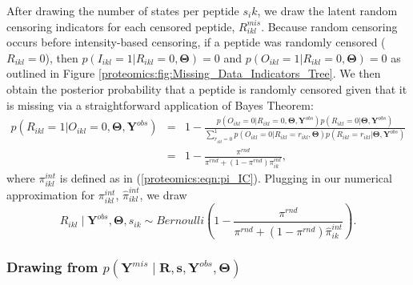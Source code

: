 After drawing the number of states per peptide $s_ik$, we draw the latent random censoring indicators for each censored peptide, $R_{ikl}^{mis}$.
Because random censoring occurs before intensity-based censoring, if a peptide was randomly censored ($R_{ikl}=0$), then $p(I_{ikl}=1\vert R_{ikl}=0,\bm{\Theta})=0$ and $p(O_{ikl}=1\vert R_{ikl}=0,\bm{\Theta})=0$ as outlined in Figure \ref{proteomics:fig:Missing_Data_Indicators_Tree}.
We then obtain the posterior probability that a peptide is randomly censored given that it is missing via a straightforward application of Bayes Theorem:
\begin{eqnarray}
p(R_{ikl}=1\vert O_{ikl}=0,\bm{\Theta}, \bm{Y}^{obs}) & = & 1 - \frac{p(O_{ikl}=0\vert R_{ikl}=0,\bm{\Theta}, \bm{Y}^{obs})p(R_{ikl}=0\vert\bm{\Theta}, \bm{Y}^{obs})}{\sum_{r_{ikl}=0}^{1}p(O_{ikl}=0\vert R_{ikl}=r_{ikl},\bm{\Theta})p(R_{ikl}=r_{ikl}\vert\bm{\Theta}, \bm{Y}^{obs})}\nonumber \\
 & = & 1 - \frac{\pi^{rnd}}{\pi^{rnd}+(1-\pi^{rnd})\pi_{ik}^{int}},
\end{eqnarray}
where $\pi_{ikl}^{int}$ is defined as in (\ref{proteomics:eqn:pi_IC}).
Plugging in our numerical approximation for $\pi_{ikl}^{int}$, $\hat{\pi}_{ikl}^{int}$, we draw
\begin{equation}
R_{ikl} \mid \bm{Y}^{obs}, \bm{\Theta}, s_{ik} \sim Bernoulli\left(1 - \frac{\pi^{rnd}}{\pi^{rnd}+(1-\pi^{rnd})\hat{\pi}_{ik}^{int}}\right) .
\end{equation}


\subsubsection{Drawing from $p(\bm{Y}^{mis} \mid \bm{R}, \bm{s}, \bm{Y}^{obs}, \bm{\Theta})$}
\label{proteomics:sec:y_ikl_mis_draw}

